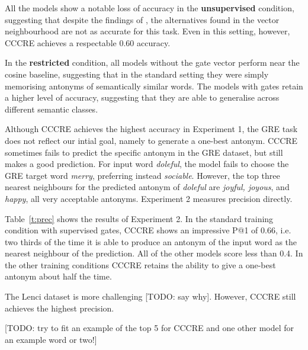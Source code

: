 \documentclass[11pt]{article}
\begin{document}
All the models show a notable loss of accuracy in the {\bf unsupervised} condition,
suggesting that despite the findings of \citet{kruszewski:16}, the alternatives found in the vector neighbourhood are not as accurate for this task. 
Even in this setting, however, CCCRE achieves a respectable 0.60 accuracy.

In the {\bf restricted} condition, 
all models without the gate vector perform near the cosine baseline, suggesting that in the standard setting they were simply memorising antonyms of semantically similar words. The models with gates retain a higher level of accuracy, suggesting that they are able to generalise across different semantic classes.

Although CCCRE achieves the highest accuracy in Experiment 1, the GRE task does not reflect our intial goal, namely to generate a one-best antonym. CCCRE sometimes fails to predict the specific antonym in the GRE dataset, but still makes a good prediction. For input word {\it doleful}, the model fails to choose the GRE target word {\it merry}, preferring instead {\it sociable}. However, the top three nearest neighbours for the predicted antonym of {\it doleful} are {\it joyful, joyous}, and {\it happy}, all very acceptable antonyms. Experiment 2 measures precision directly.

Table~\ref{t:prec} shows the results of Experiment 2. In the standard training condition with supervised gates, CCCRE shows an impressive P@1 of 0.66, i.e. two thirds of the time it is able to produce an antonym of the input word as the nearest neighbour of the prediction. All of the other models score less than 0.4. In the other training conditions CCCRE retains the ability to give a one-best antonym about half the time.

The Lenci dataset is more challenging [TODO: say why]. However, CCCRE still achieves the highest precision.

[TODO: try to fit an example of the top 5 for CCCRE and one other model for an example word or two!]

\end{document}
